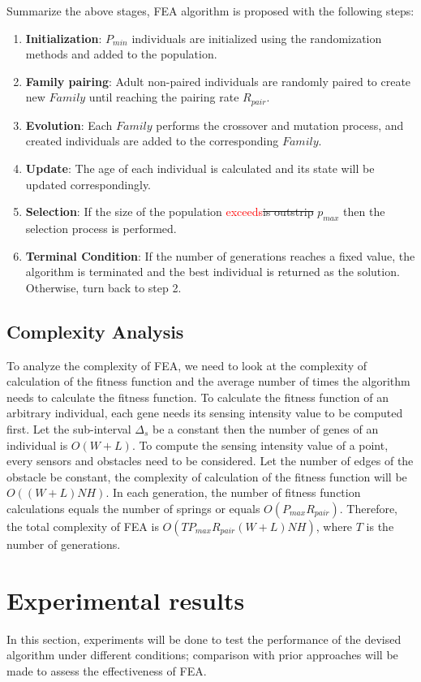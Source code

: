 \documentclass[final]{elsarticle}
\begin{document}
Summarize the above stages, FEA algorithm is proposed with the following steps:

\begin{enumerate}
	\item \textbf{Initialization}: $P_{min}$ individuals are initialized using the randomization methods and added to the population.
	\item \textbf{Family pairing}: Adult non-paired individuals are randomly paired to create new $ Family $ until reaching the pairing rate $R_{pair}$.
	\item \textbf{Evolution}: Each $ Family $ performs the crossover and mutation process, and created individuals are added to the corresponding $ Family $.
	\item \textbf{Update}: The age of each individual is calculated and its state will be updated correspondingly.
	\item \textbf{Selection}: If the size of the population \textcolor{red}{exceeds}\sout{is outstrip} $p_{max}$ then the selection process is performed.
	\item \textbf{Terminal Condition}: If the number of generations reaches a fixed value, the algorithm is terminated and the best individual is returned as the solution. Otherwise, turn back to step 2.
\end{enumerate}

\subsection{Complexity Analysis}

To analyze the complexity of FEA, we need to look at the complexity of calculation of the fitness function and the average number of times the algorithm needs to calculate the fitness function. To calculate the fitness function of an arbitrary individual, each gene needs its sensing intensity value to be computed first. Let the sub-interval $ \Delta_s $ be a constant then the number of genes of an individual is $ O(W+L) $. To compute the sensing intensity value of a point, every sensors and obstacles need to be considered. Let the number of edges of the obstacle be constant, the complexity of calculation of the fitness function will be $ O((W+L)NH) $. In each generation, the number of fitness function calculations equals the number of springs or equals $O(P_{max}R_{pair})$. Therefore, the total complexity of FEA is $O(TP_{max}R_{pair}(W+L)NH)$, where $ T $ is the number of generations.

\section{Experimental results}
In this section, experiments will be done to test the performance of the devised algorithm under different conditions; comparison with prior approaches will be made to assess the effectiveness of FEA. 
\end{document}
